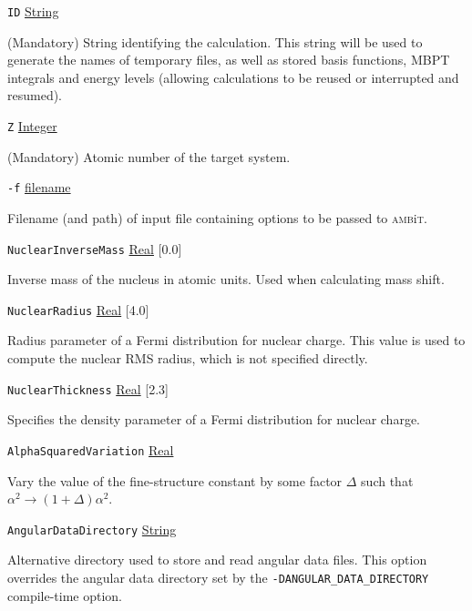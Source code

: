 \documentclass{report}
\newcommand{\ambit}{\textsc{amb}{\footnotesize i}\textsc{t}}
\begin{document}
\texttt{ID} \uline{String}
\begin{adjustwidth}{1cm}{}
(Mandatory) String identifying the calculation. This string will be used to generate the names of 
temporary files, as well as stored basis functions, MBPT integrals and energy levels 
(allowing calculations to be reused or interrupted and resumed).
\end{adjustwidth}

\texttt{Z} \uline{Integer}
\begin{adjustwidth}{1cm}{}
(Mandatory) Atomic number of the target system. 
\end{adjustwidth}

\texttt{-f} \uline{filename}
\begin{adjustwidth}{1cm}{}
Filename (and path) of input file containing options to be passed to \ambit. 
\end{adjustwidth}

\texttt{NuclearInverseMass} \uline{Real} [0.0]
\begin{adjustwidth}{1cm}{}
Inverse mass of the nucleus in atomic units. Used when calculating mass shift.
\end{adjustwidth}

\texttt{NuclearRadius} \uline{Real} [4.0]
\begin{adjustwidth}{1cm}{}
Radius parameter of a Fermi distribution for nuclear charge. This value is 
used to compute the nuclear RMS radius, which is not specified directly.
\end{adjustwidth}

\texttt{NuclearThickness} \uline{Real} [2.3]
\begin{adjustwidth}{1cm}{}
Specifies the density parameter of a Fermi distribution for nuclear charge.
\end{adjustwidth}

\texttt{AlphaSquaredVariation} \uline{Real}
\begin{adjustwidth}{1cm}{}
Vary the value of the fine-structure constant by some factor $\Delta$ such that 
$\alpha^2 \to (1 + \Delta)\alpha^2$. 
\end{adjustwidth}

\texttt{AngularDataDirectory} \uline{String}
\begin{adjustwidth}{1cm}{}
Alternative directory used to store and read angular data files. This option overrides the angular data
directory set by the \texttt{-DANGULAR\_DATA\_DIRECTORY} compile-time option.
\end{adjustwidth}
\end{document}
